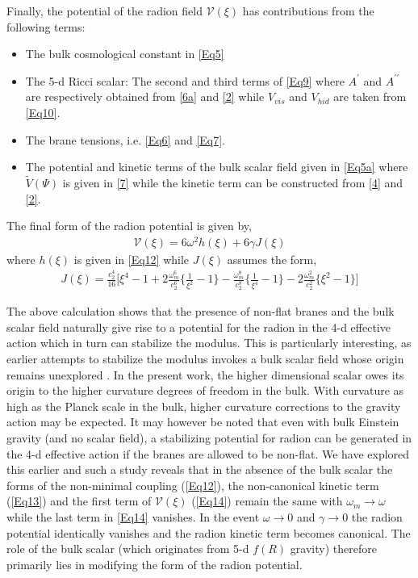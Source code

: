 \documentclass{article}
\begin{document}
Finally, the potential of the radion field $\mathcal{V}(\xi)$ has contributions from the following terms:
\begin{itemize}
\item The bulk cosmological constant in \ref{Eq5}
\item The 5-d Ricci scalar: The second and third terms of \ref{Eq9} where $A^\prime$ and $A^{\prime\prime}$ are respectively obtained from \ref{6a} and \ref{2} while $V_{vis}$ and $V_{hid}$ are taken from \ref{Eq10}.
\item The brane tensions, i.e. \ref{Eq6} and \ref{Eq7}.
\item The potential and kinetic terms of the bulk scalar field given in \ref{Eq5a} where $\tilde{V}(\Psi)$ is given in \ref{7} while the kinetic term can be constructed from \ref{4} and \ref{2}.
\end{itemize}
The final form of the radion potential is given by,
\begin{align}
\mathcal{V}(\xi)=6\omega^2 h(\xi) + 6\gamma J(\xi)
\label{Eq14}
\end{align}
where $h(\xi)$ is given in \ref{Eq12} while $J(\xi)$ assumes the form,
\begin{align}
\label{Eq15}
J(\xi)=\frac{c_2^4}{16}\Bigg[\xi^4 -1 + 2 \frac{\omega_m^6}{c_2^6} \Bigg\lbrace \frac{1}{\xi^2}-1
\Bigg\rbrace - \frac{\omega_m^8}{c_2^8} \Bigg\lbrace \frac{1}{\xi^4}-1\Bigg\rbrace - 2\frac{\omega_m^2}{c_2^2} \Bigg\lbrace {\xi^2}-1\Bigg\rbrace\Bigg]
\end{align}

The above calculation shows that the presence of non-flat branes and the bulk scalar field naturally give rise to a potential for the radion in the 4-d effective action which in turn can stabilize the modulus. This is particularly interesting, as earlier attempts to stabilize the modulus invokes a bulk scalar field whose origin remains unexplored \cite{Goldberger:1999uk}. In the present work, the higher dimensional scalar owes its origin to the higher curvature degrees of freedom in the bulk. With curvature as high as the Planck scale in the bulk, higher curvature corrections to the gravity action may be expected. It may however be noted that even with bulk Einstein gravity (and no scalar field), a stabilizing potential for radion can be generated in the 4-d effective action if the branes are allowed to be non-flat. We have explored this earlier \cite{Banerjee:2017jyk,Banerjee:2018kcz,Banerjee:2020uil} and such a study reveals that in the absence of the bulk scalar the forms of the non-minimal coupling (\ref{Eq12}), the non-canonical kinetic term (\ref{Eq13}) and the first term of $\mathcal{V}(\xi)$ (\ref{Eq14}) remain the same with $\omega_m\to \omega$ while the last term in \ref{Eq14} vanishes. 
In the event $\omega\to 0$ and $\gamma\to 0$ the radion potential identically vanishes and the radion kinetic term becomes canonical. 
The role of the bulk scalar (which originates from 5-d $f(R)$ gravity) therefore primarily lies in modifying the form of the radion potential. 
\end{document}
